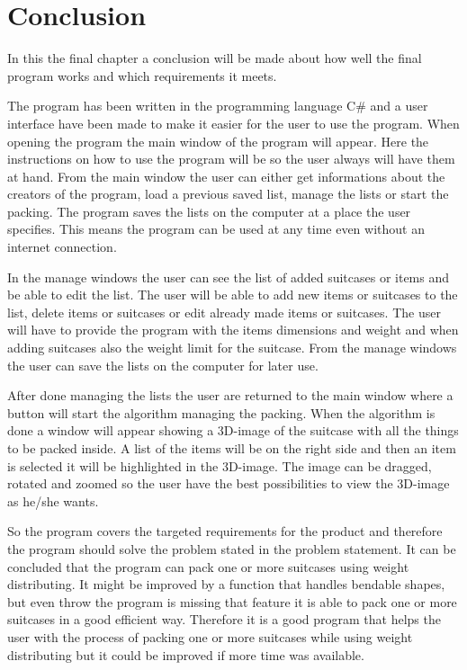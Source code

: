 \chapter{Conclusion}
In this the final chapter a conclusion will be made about how well the final program works and which requirements it meets.

The program has been written in the programming language C\# and a user interface have been made to make it easier for the user to use the program. When opening the program the main window of the program will appear. Here the instructions on how to use the program will be so the user always will have them at hand. From the main window the user can either get informations about the creators of the program, load a previous saved list, manage the lists or start the packing. The program saves the lists on the computer at a place the user specifies. This means the program can be used at any time even without an internet connection. 

In the manage windows the user can see the list of added suitcases or items and be able to edit the list. The user will be able to add new items or suitcases to the list, delete items or suitcases or edit already made items or suitcases. The user will have to provide the program with the items dimensions and weight and when adding suitcases also the weight limit for the suitcase. From the manage windows the user can save the lists on the computer for later use. 

After done managing the lists the user are returned to the main window where a button will start the algorithm managing the packing. When the algorithm is done a window will appear showing a 3D-image of the suitcase with all the things to be packed inside. A list of the items will be on the right side and then an item is selected it will be highlighted in the 3D-image. The image can be dragged, rotated and zoomed so the user have the best possibilities to view the 3D-image as he/she wants.

So the program covers the targeted requirements for the product and therefore the program should solve the problem stated in the problem statement. It can be concluded that the program can pack one or more suitcases using weight distributing. It might be improved by a function that handles bendable shapes, but even throw the program is missing that feature it is able to pack one or more suitcases in a good efficient way. Therefore it is a good program that helps the user with the process of packing one or more suitcases while using weight distributing but it could be improved if more time was available. 
